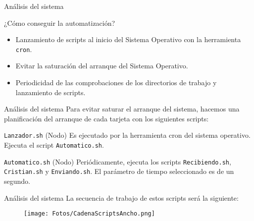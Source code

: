 \documentclass[aspectratio=169]{beamer}
\begin{document}
\begin{frame}{Análisis del sistema}
	\begin{block}{¿Cómo conseguir la automatización?}
		\begin{itemize}
			\item Lanzamiento de scripts al inicio del Sistema Operativo con la herramienta \texttt{cron}.
			\item Evitar la saturación del arranque del Sistema Operativo.
			\item Periodicidad de las comprobaciones de los directorios de trabajo y lanzamiento de scripts.
		\end{itemize}
	\end{block}
\end{frame}

\begin{frame}{Análisis del sistema}
Para evitar saturar el arranque del sistema, hacemos una planificación del arranque de cada tarjeta con los siguientes scripts:
	\begin{block}{\texttt{Lanzador.sh} (Nodo)}
		Es ejecutado por la herramienta cron del sistema operativo.
		Ejecuta el script \texttt{Automatico.sh}.
	\end{block}
	\begin{block}{\texttt{Automatico.sh} (Nodo)}
		Periódicamente, ejecuta los scripts \texttt{Recibiendo.sh}, \texttt{Cristian.sh} y \texttt{Enviando.sh}.
		El parámetro de tiempo seleccionado es de un segundo. %
	\end{block}
\end{frame}

\begin{frame}{Análisis del sistema}
	La secuencia de trabajo de estos scripts será la siguiente:
	\begin{figure}[h]
		\centering
		\texttt{[image: Fotos/CadenaScriptsAncho.png]}
	\end{figure}
\end{frame}
\end{document}
